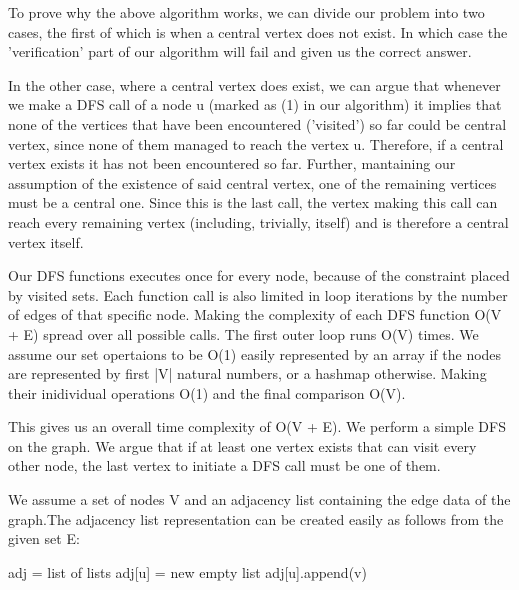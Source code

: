 \documentclass[letterpaper, 11pt]{article}
\begin{document}
To prove why the above algorithm works, we can divide our problem into two cases, the first of which is when a central vertex does not exist. In which case the 'verification' part of our algorithm will fail and given us the correct answer.

In the other case, where a central vertex does exist, we can argue that whenever we make a DFS call of a node u (marked as (1) in our algorithm) it implies that none of the vertices that have been encountered ('visited') so far could be central vertex, since none of them managed to reach the vertex u. Therefore, if a central vertex exists it has not been encountered so far. Further, mantaining our assumption of the existence of said central vertex, one of the remaining vertices must be a central one. Since this is the last call, the vertex making this call can reach every remaining vertex (including, trivially, itself) and is therefore a central vertex itself.

Our DFS functions executes once for every node, because of the constraint placed by visited sets. Each function call is also limited in loop iterations by the number of edges of that specific node. Making the complexity of each DFS function O(V + E) spread over all possible calls. The first outer loop runs O(V) times. We assume our set opertaions to be O(1) easily represented by an array if the nodes are represented by first |V| natural numbers, or a hashmap otherwise. Making their inidividual operations O(1) and the final comparison O(V).

This gives us an overall time complexity of O(V + E).
\newpage
We perform a simple DFS on the graph. We argue that if at least one vertex exists that can visit every other node, the last vertex to initiate a DFS call must be one of them.

We assume a set of nodes V and an adjacency list containing the edge data of the graph.The adjacency list representation can be created easily as follows from the given set E:
\newline 

\begin {algorithm}[]
    \begin{algorithmic}[1]
        \State{} adj = list of lists
        \State{}adj[u] = new empty list
        \EndFor
        \State{}adj[u].append(v)
        \EndFor
        \EndFunction{}
    \end{algorithmic}
\end{algorithm}
\end{document}
